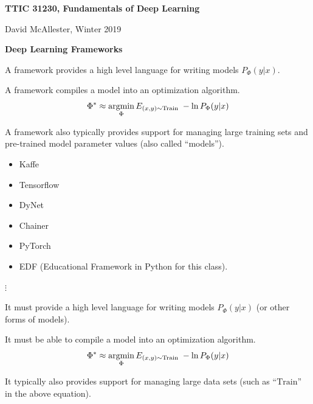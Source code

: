 




{\Huge
  
  \centerline{\bf TTIC 31230, Fundamentals of Deep Learning}
  \bigskip
  \centerline{David McAllester, Winter 2019}
  \vfill
  \vfill
  \centerline{\bf Deep Learning Frameworks}
  \vfill
  \vfill


A framework provides a high level language for writing models $P_\Phi(y|x)$.

\vfill
A framework compiles a model into an optimization algorithm.
\vfill
{\color{red} $$\Phi^* \approx \operatorname*{argmin}_\Phi E_{(x,y) \sim \mathrm{Train}} \; -\ln P_\Phi(y|x)$$}

\vfill
A framework also typically provides support for managing large training sets and pre-trained model parameter values (also called ``models'').


\begin{itemize}
  
\item Kaffe

\vfill

\item Tensorflow

\vfill

\item DyNet

  \vfill
\item Chainer

\vfill

\item PyTorch

  \vfill

\item EDF (Educational Framework in Python for this class).
\end{itemize}

$\vdots$


It must provide a high level language for writing models $P_\Phi(y|x)$ (or other forms of models).

\vfill
It must be able to compile a model into an optimization algorithm.
\vfill
{\color{red} $$\Phi^* \approx \operatorname*{argmin}_\Phi E_{(x,y) \sim \mathrm{Train}} \; -\ln P_\Phi(y|x)$$}

\vfill
It typically also provides support for managing large data sets (such as {\color{red} ``$\mathrm{Train}$''} in the above equation).

}
